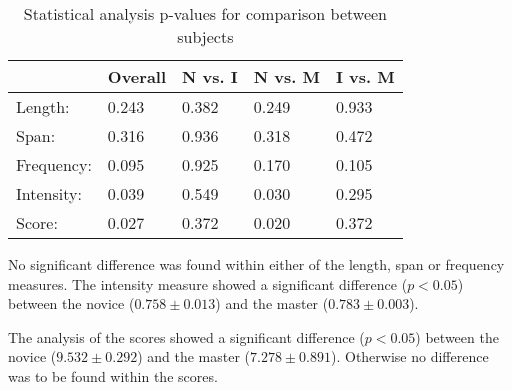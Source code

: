 \begin{table}[h]
	\begin{tabular}{|l|l|l|l|l|}
		\hline
		& Overall & N vs. I & N vs. M & I vs. M \\ \hline
		Length:    & 0.243   & 0.382   & 0.249   & 0.933   \\ \hline
		Span:      & 0.316   & 0.936   & 0.318   & 0.472   \\ \hline
		Frequency: & 0.095   & 0.925   & 0.170   & 0.105   \\ \hline
		Intensity: & 0.039   & 0.549   & 0.030   & 0.295   \\ \hline
		Score:     & 0.027   & 0.372   & 0.020   & 0.372   \\ \hline
	\end{tabular}
	\caption{Statistical analysis p-values for comparison between subjects}
	\label{tab:pValues}
\end{table}

No significant difference was found within either of the length, span or frequency measures. The intensity measure showed a significant difference ($p<0.05$) between the novice ($0.758 \pm 0.013$) and the master ($0.783 \pm 0.003$).

The analysis of the scores showed a significant difference ($p<0.05$) between the novice ($9.532 \pm 0.292$) and the master ($7.278 \pm 0.891$). Otherwise no difference was to be found within the scores.
